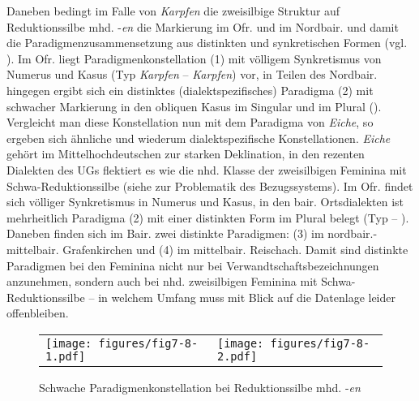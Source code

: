 Daneben bedingt im Falle von \textit{Karpfen} die zweisilbige Struktur auf Reduktionssilbe mhd. -\textit{en} die Markierung im Ofr. und im Nordbair. und damit die Paradigmenzusammensetzung aus distinkten und synkretischen Formen (vgl. ). Im Ofr. liegt Paradigmenkonstellation (1) mit völligem Synkretismus von Numerus und Kasus (Typ \textit{Karpfen} -- \textit{Karpfen}) vor, in Teilen des Nordbair. hingegen ergibt sich ein distinktes (dialektspezifisches) Paradigma (2) mit schwacher Markierung in den obliquen Kasus im Singular und im Plural (). Vergleicht man diese Konstellation nun mit dem Paradigma von \textit{Eiche}, so ergeben sich ähnliche und wiederum dialektspezifische Konstellationen. \textit{Eiche} gehört im Mittelhochdeutschen zur starken Deklination, in den rezenten Dialekten des UGs flektiert es wie die nhd. Klasse der zweisilbigen Feminina mit Schwa-Reduktionssilbe (siehe  zur Problematik des Bezugssystems). Im Ofr. findet sich völliger Synkretismus in Numerus und Kasus, in den bair. Ortsdialekten ist mehrheitlich Paradigma (2) mit einer distinkten Form im Plural belegt (Typ  -- ). Daneben finden sich im Bair. zwei distinkte Paradigmen: (3) im nordbair.-mittelbair. Grafenkirchen und (4) im mittelbair. Reischach. Damit sind distinkte Paradigmen bei den Feminina nicht nur bei Verwandtschaftsbezeichnungen anzunehmen, sondern auch bei nhd. zweisilbigen Feminina mit Schwa-Reduktionssilbe -- in welchem Umfang muss mit Blick auf die Datenlage leider offenbleiben.

\begin{figure}%
\begin{tabular}{@{}p{}@{}p{}@{}}
  \vspace{0pt} \texttt{[image: figures/fig7-8-1.pdf]} &
  \vspace{0pt} \texttt{[image: figures/fig7-8-2.pdf]}
\end{tabular}
\caption{Schwache Paradigmenkonstellation bei Reduktionssilbe mhd. -\textit{en}}
\label{fig:10}
\end{figure}


